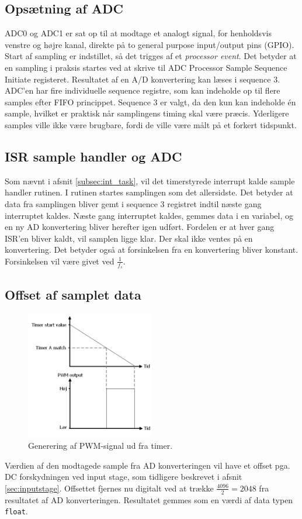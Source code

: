 \subsection{Opsætning af ADC}
ADC0 og ADC1 er sat op til at modtage et analogt signal, for henholdsvis venstre og højre kanal, direkte på to general purpose input/output pins (GPIO). 
Start af sampling er indstillet, så det trigges af et \textit{processor event}. 
Det betyder at en sampling i praksis startes ved at skrive til ADC Processor Sample Sequence Initiate registeret. 
Resultatet af en A/D konvertering kan læses i sequence 3. 
ADC'en har fire individuelle sequence registre, som kan indeholde op til flere samples efter FIFO princippet. 
Sequence 3 er valgt, da den kun kan indeholde én sample, hvilket er praktisk når samplingens timing skal være præcis. 
Yderligere samples ville ikke være brugbare, fordi de ville være målt på et forkert tidspunkt. 

\subsection{ISR sample handler og ADC}
Som nævnt i afsnit \ref{subsec:int_task}, vil det timerstyrede interrupt kalde sample handler rutinen.
I rutinen startes samplingen som det allersidste. 
Det betyder at data fra samplingen bliver gemt i sequence 3 registret indtil næste gang interruptet kaldes. 
Næste gang interruptet kaldes, gemmes data i en variabel, og en ny AD konvertering bliver herefter igen udført. 
Fordelen er at hver gang ISR'en bliver kaldt, vil samplen ligge klar.
Der skal ikke ventes på en konvertering. 
Det betyder også at forsinkelsen fra en konvertering bliver konstant. Forsinkelsen vil være givet ved $\frac{1}{f_s}$. 

\subsection{Offset af samplet data}
\begin{figure}
	\centering
	\includegraphics[width=0.5\textwidth]{billeder/timer3PWM.png}
	\caption{\label{fig:PWMfromtimer}Generering af PWM-signal ud fra timer. }
\end{figure}
Værdien af den modtagede sample fra AD konverteringen vil have et offset pga. DC forskydningen ved input stage, som tidligere beskrevet i afsnit \ref{sec:inputstage}.
Offsettet fjernes nu digitalt ved at trække $\frac{4096}{2} = 2048$ fra resultatet af AD konverteringen. 
Resultatet gemmes som en værdi af data typen \texttt{float}. 

